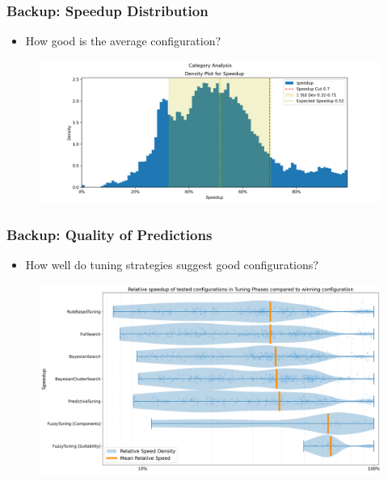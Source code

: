 \documentclass[
	10pt,
	t		%
]{beamer}
\begin{document}
\begin{frame}
	\frametitle{Backup: Speedup Distribution}
	
	\begin{itemize}
		\item How good is the average configuration?
	\end{itemize}
	
	\begin{figure}
		\centering
		\includegraphics[width=1\textwidth]{figures/speedup.png}
	\end{figure}
\end{frame}

\begin{frame}
	\frametitle{Backup: Quality of Predictions}
	
	\begin{itemize}
		\item How well do tuning strategies suggest good configurations?
	\end{itemize}
	
	\begin{figure}
		\includegraphics[width=0.8\paperwidth]{figures/prediction-quality.png}
	\end{figure}
	
\end{frame}
\end{document}
